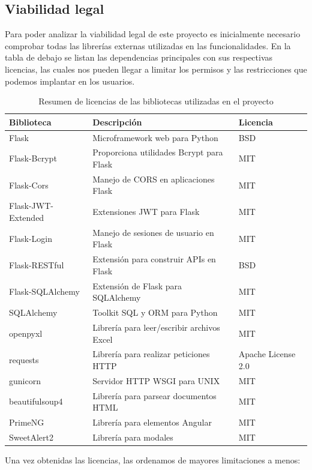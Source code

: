 \subsection{Viabilidad legal}
Para poder analizar la viabilidad legal de este proyecto es inicialmente necesario comprobar todas las librerías externas utilizadas en las funcionalidades.
En la tabla de debajo se listan las dependencias principales con sus respectivas licencias, las cuales nos pueden llegar a limitar los permisos y las restricciones que podemos implantar en los usuarios.

\begin{table}[ht]
\centering
\begin{tabular}{@{}lll@{}}
\toprule
Biblioteca & Descripción & Licencia \\ 
\midrule
Flask & Microframework web para Python & BSD \\
Flask-Bcrypt & Proporciona utilidades Bcrypt para Flask & MIT \\
Flask-Cors & Manejo de CORS en aplicaciones Flask & MIT \\
Flask-JWT-Extended & Extensiones JWT para Flask & MIT \\
Flask-Login & Manejo de sesiones de usuario en Flask & MIT \\
Flask-RESTful & Extensión para construir APIs en Flask & BSD \\
Flask-SQLAlchemy & Extensión de Flask para SQLAlchemy & MIT \\
SQLAlchemy & Toolkit SQL y ORM para Python & MIT \\
openpyxl & Librería para leer/escribir archivos Excel & MIT \\
requests & Librería para realizar peticiones HTTP & Apache License 2.0 \\
gunicorn & Servidor HTTP WSGI para UNIX & MIT \\
beautifulsoup4 & Librería para parsear documentos HTML & MIT \\
PrimeNG & Librería para elementos Angular & MIT \\
SweetAlert2 & Librería para modales & MIT \\
\bottomrule
\end{tabular}
\caption{Resumen de licencias de las bibliotecas utilizadas en el proyecto}
\end{table}
Una vez obtenidas las licencias, las ordenamos de mayores limitaciones a menos:
